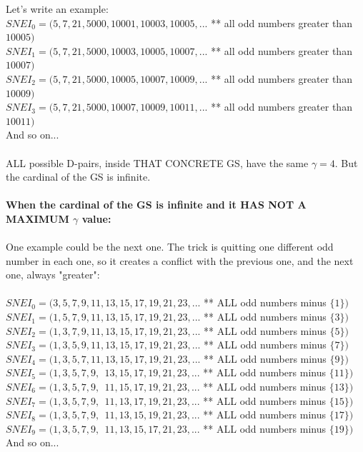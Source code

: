 		\noindent
		Let's write an example:\\
		$ SNEI_{0} = (5, 7, 21, 5000, 10001, 10003, 10005, ...$ ** all odd numbers greater than $10005)  $\\
		$ SNEI_{1} = (5, 7, 21, 5000, 10003, 10005, 10007, ...$ ** all odd numbers greater than $10007)  $\\
		$ SNEI_{2} = (5, 7, 21, 5000, 10005, 10007, 10009, ...$ ** all odd numbers greater than $10009)  $\\
		$ SNEI_{3} = (5, 7, 21, 5000, 10007, 10009, 10011, ...$ ** all odd numbers greater than $10011)  $\\
		And so on...
		\\\\
		
		\noindent
		ALL possible D-pairs, inside THAT CONCRETE GS, have the same $\gamma=4$. But the cardinal of the GS is infinite.
		\\\\
		
		\noindent
		\textbf{When the cardinal of the GS is infinite and it HAS NOT A MAXIMUM $\gamma$ value:}
		\\\\
		
		\noindent
		One example could be the next one. The trick is quitting one different odd number in each one, so it creates a conflict with the previous one, and the next one, always "greater":
		\\\\
		
		\noindent
		$SNEI_{0}= ( 3, 5, 7, 9, 11, 13, 15, 17, 19, 21, 23, ...$ ** ALL odd numbers minus $\{1\})$ \\
		$SNEI_{1}= ( 1, 5, 7, 9, 11, 13, 15, 17, 19, 21, 23, ...$ ** ALL odd numbers minus $\{3\})$ \\
		$SNEI_{2}= ( 1, 3, 7, 9, 11, 13, 15, 17, 19, 21, 23, ...$ ** ALL odd numbers minus $\{5\})$ \\
		$SNEI_{3}= ( 1, 3, 5, 9, 11, 13, 15, 17, 19, 21, 23, ...$ ** ALL odd numbers minus $\{7\})$ \\
		$SNEI_{4}= ( 1, 3, 5, 7, 11, 13, 15, 17, 19, 21, 23, ...$ ** ALL odd numbers minus $\{9\})$ \\
		$SNEI_{5}= ( 1, 3, 5, 7, 9,\:\:13, 15, 17, 19, 21, 23, ...$ ** ALL odd numbers minus $\{11\})$ \\	
		$SNEI_{6}= ( 1, 3, 5, 7, 9,\:\:11, 15, 17, 19, 21, 23,  ...$ ** ALL odd numbers minus $\{13\})$ \\
		$SNEI_{7}= ( 1, 3, 5, 7, 9,\:\:11, 13, 17, 19, 21, 23,  ...$ ** ALL odd numbers minus $\{15\})$ \\
		$SNEI_{8}= ( 1, 3, 5, 7, 9,\:\:11, 13, 15, 19, 21, 23,  ...$ ** ALL odd numbers minus $\{17\})$ \\
		$SNEI_{9}= ( 1, 3, 5, 7, 9,\:\:11, 13, 15, 17, 21, 23,  ...$ ** ALL odd numbers minus $\{19\})$ \\
		And so on...
		\\\\
		
